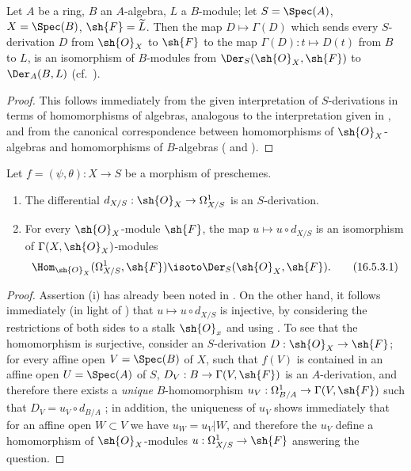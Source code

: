 \begin{proposition}[16.5.2]
\label{IV.16.5.2}
Let $A$ be a ring, $B$ an $A$-algebra, $L$ a $B$-module;
let $S = \Spec(A)$, $X=\Spec(B)$, $\sh{F} = \widetilde{L}$.
Then the map $D \mapsto \Gamma(D)$ which sends every $S$-derivation $D$ from $\sh{O}_X$ to $\sh{F}$ to the map $\Gamma(D) : t \mapsto D(t)$ from $B$ to $L$, is an isomorphism of $B$-modules from $\Der_S(\sh{O}_X, \sh{F})$ to $\Der_A(B, L)$ (cf.~).
\end{proposition}

\begin{proof}
This follows immediately from the given interpretation of $S$-derivations in terms
of homomorphisms of algebras, analogous to the interpretation given in , and from the canonical correspondence between homomorphisms of $\sh{O}_X$-algebras and homomorphisms of $B$-algebras ( and ).
\end{proof}

\begin{proposition}[16.5.3]
\label{IV.16.5.3}
Let $f = (\psi, \theta) : X \to S$ be a morphism of preschemes.
\begin{enumerate}
  \item[{\rm(i)}] The differential $d_{X/S} : \sh{O}_X \to \Omega_{X/S}^1$  is an $S$-derivation.
  \item[{\rm(ii)}] For every $\sh{O}_X$-module $\sh{F}$, the map $u \mapsto u \circ d_{X/S}$ is an isomorphism of $\Gamma(X, \sh{O}_X)$-modules
  \[
  \label{IV.16.5.3.1}
    \Hom_{\sh{O}_X}(\Omega_{X/S}^1, \sh{F}) \isoto \Der_S(\sh{O}_X, \sh{F}).
    \tag{16.5.3.1}
  \]
\end{enumerate}
\end{proposition}

\begin{proof}
Assertion (i) has already been noted in .
On the other hand, it follows immediately (in light of ) that $u \mapsto u\circ d_{X/S}$ is injective, by considering the restrictions of both sides to a stalk $\sh{O}_x$ and using .
To see that the homomorphism  is surjective, consider an $S$-derivation $D : \sh{O}_X \to \sh{F}$;
for every affine open $V = \Spec(B)$ of $X$, such that $f(V)$ is contained in an affine open $U = \Spec(A)$ of $S$, $D_V : B \to \Gamma(V, \sh{F}) $ is an $A$-derivation, and therefore there exists a \emph{unique} $B$-homomorphism $u_V : \Omega_{B/A}^1 \to \Gamma(V, \sh{F})$ such that $D_V = u_V \circ d_{B/A}$ ;
in addition, the uniqueness of $u_V$ shows immediately that for an affine open $W \subset V$ we have $u_W = u_V|W$, and therefore the $u_V$ define a homomorphism of $\sh{O}_X$-modules $u : \Omega_{X/S}^1 \to \sh{F}$ answering the question.
\end{proof}

